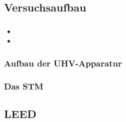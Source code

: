 \documentclass{beamer}
\begin{document}
\subsection[Versuchsaufbau]{Versuchsaufbau}

\begin{frame}
\frametitle{}
\begin{itemize}
  \item
  \item
\end{itemize}
\end{frame}

\begin{frame}
\frametitle{Aufbau der UHV-Apparatur}
\begin{figure}[H]
\centering
\sffamily

\end{figure}
\end{frame}

\begin{frame}
\frametitle{Das STM}
\begin{figure}[H]
\centering
\sffamily

\end{figure}
\end{frame}



\subsection[Ergebnisse]{LEED}
\end{document}
